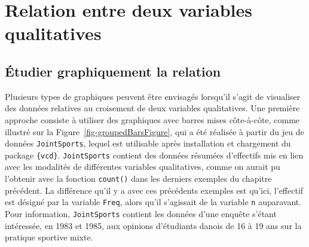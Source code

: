 \documentclass[
  letterpaper,
]{book}
\begin{document}
\section{Relation entre deux variables
qualitatives}\label{relation-entre-deux-variables-qualitatives}

\subsection{Étudier graphiquement la
relation}\label{uxe9tudier-graphiquement-la-relation-1}

Plusieurs types de graphiques peuvent être envisagés lorsqu'il s'agit de
visualiser des données relatives au croisement de deux variables
qualitatives. Une première approche consiste à utiliser des graphiques
avec barres mises côte-à-côte, comme illustré sur la
Figure~\ref{fig-groupedBarsFigure}, qui a été réalisée à partir du jeu
de données \texttt{JointSports}, lequel est utilisable après
installation et chargement du package \texttt{\{vcd\}}.
\texttt{JointSports} contient des données résumées d'effectifs mis en
lien avec les modalités de différentes variables qualitatives, comme on
aurait pu l'obtenir avec la fonction \texttt{count()} dans les derniers
exemples du chapitre précédent. La différence qu'il y a avec ces
précédents exemples est qu'ici, l'effectif est désigné par la variable
\texttt{Freq}, alors qu'il s'agissait de la variable \texttt{n}
auparavant. Pour information, \texttt{JointSports} contient les données
d'une enquête s'étant intéressée, en 1983 et 1985, aux opinions
d'étudiants danois de 16 à 19 ans sur la pratique sportive mixte.
\end{document}
